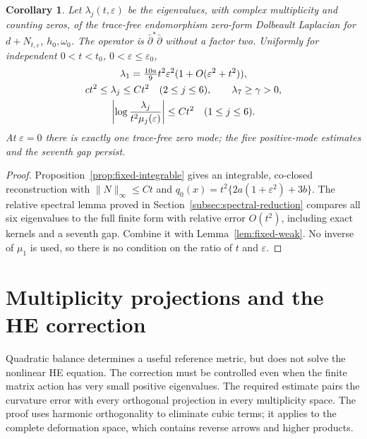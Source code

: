 \documentclass[11pt]{amsart}
\newtheorem{corollary}[theorem]{Corollary}
\theoremstyle{definition}
\theoremstyle{remark}
\begin{document}
\begin{corollary}\label{thm:fixed-spectrum}
Let $\lambda_j(t,\varepsilon)$ be the eigenvalues, with complex
multiplicity and counting zeros, of the trace-free endomorphism zero-form
Dolbeault Laplacian for $d+N_{t,\varepsilon}$, $h_0,\omega_0$.
The operator is $\bar\partial^*\bar\partial$ without a factor two.
Uniformly for independent $0<t<t_0$, $0<\varepsilon\le\varepsilon_0$,
\begin{gather}
 \lambda_1=\tfrac{10a}{9}t^2\varepsilon^2
                  (1+O(\varepsilon^2+t^2)),\label{eq:fixed-weak-law}\\
 ct^2\le\lambda_j\le Ct^2\quad(2\le j\le6),\qquad
 \lambda_7\ge\gamma>0,\notag\\
 \left|\log\frac{\lambda_j}{t^2\mu_j(\varepsilon)}\right|
 \le Ct^2\quad(1\le j\le6).\notag
\end{gather}
At $\varepsilon=0$ there is exactly one trace-free zero mode; the
five positive-mode estimates and the seventh gap persist.
\end{corollary}
\begin{proof}
Proposition~\ref{prop:fixed-integrable} gives an integrable, co-closed
reconstruction with $\|N\|_\infty\le Ct$ and
$q_0(x)=t^2\{2a(1+\varepsilon^2)+3b\}$. The relative spectral
lemma proved in Section~\ref{subsec:spectral-reduction} compares all
six eigenvalues to the full finite form with relative error $O(t^2)$,
including exact kernels and a seventh gap. Combine it with
Lemma~\ref{lem:fixed-weak}. No inverse of $\mu_1$ is used, so there
is no condition on the ratio of $t$ and $\varepsilon$.
\end{proof}

\section{Multiplicity projections and the HE correction}\label{sec:calibration}

Quadratic balance determines a useful reference metric, but does not
solve the nonlinear HE equation. The correction must be controlled even
when the finite matrix action has very small positive eigenvalues.
The required estimate pairs the curvature error with every orthogonal
projection in every multiplicity space. The proof uses harmonic
orthogonality to eliminate cubic terms; it applies to the complete
deformation space, which contains reverse arrows and higher products.
\end{document}
